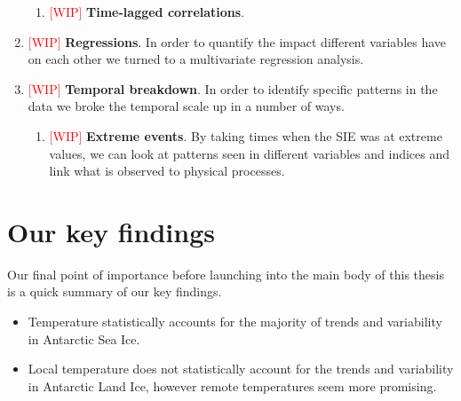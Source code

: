 \documentclass[../main.tex]{subfiles}
\begin{document}
\begin{enumerate}
\begin{enumerate}
        \item \textcolor{red}{[WIP]} \textbf{Time-lagged correlations}.
    \end{enumerate}
    \item \textcolor{red}{[WIP]} \textbf{Regressions}. In order to quantify the impact different variables have on each other we turned to a multivariate regression analysis.
    \item \textcolor{red}{[WIP]} \textbf{Temporal breakdown}. In order to identify specific patterns in the data we broke the temporal scale up in a number of ways.
    \begin{enumerate}
        \item \textcolor{red}{[WIP]} \textbf{Extreme events}. By taking times when the SIE was at extreme values, we can look at patterns seen in different variables and indices and link what is observed to physical processes.
    \end{enumerate}
\end{enumerate}



\section{Our key findings}
Our final point of importance before launching into the main body of this thesis is a quick summary of our key findings.
\begin{itemize}
    \item Temperature statistically accounts for the majority of trends and variability in Antarctic Sea Ice.
    \item Local temperature does not statistically account for the trends and variability in Antarctic Land Ice, however remote temperatures seem more promising.
\end{itemize}
\end{document}

